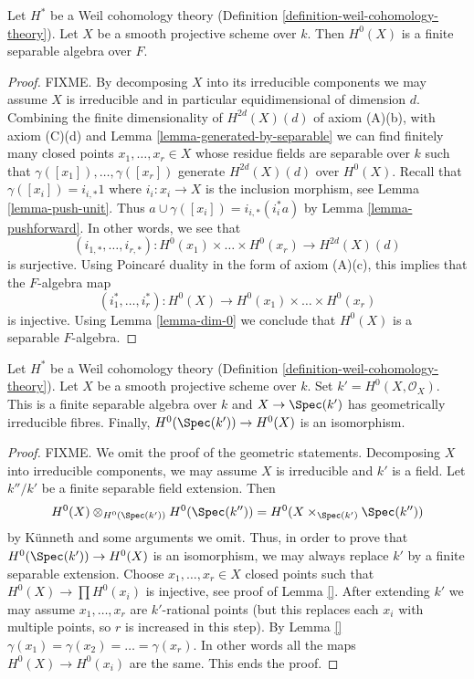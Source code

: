 \begin{lemma}
\label{lemma-H-0-separable}
Let $H^*$ be a Weil cohomology theory
(Definition \ref{definition-weil-cohomology-theory}).
Let $X$ be a smooth projective scheme over $k$. Then
$H^0(X)$ is a finite separable algebra over $F$.
\end{lemma}

\begin{proof}
FIXME. By decomposing $X$ into its irreducible components we may
assume $X$ is irreducible and in particular equidimensional
of dimension $d$. Combining the finite dimensionality of
$H^{2d}(X)(d)$ of axiom (A)(b), with axiom (C)(d) and
Lemma \ref{lemma-generated-by-separable}
we can find finitely many closed points
$x_1, \ldots, x_r \in X$ whose residue fields are
separable over $k$ such that $\gamma([x_1]), \ldots, \gamma([x_r])$
generate $H^{2d}(X)(d)$ over $H^0(X)$.
Recall that $\gamma([x_i]) = i_{i, *}1$ where
$i_i : x_i \to X$ is the inclusion morphism, see
Lemma \ref{lemma-push-unit}. Thus $a \cup \gamma([x_i]) = i_{i, *}(i_i^*a)$ by
Lemma \ref{lemma-pushforward}. In other words, we see that
$$
(i_{1, *}, \ldots, i_{r, *}) :
H^0(x_1) \times \ldots \times H^0(x_r)
\longrightarrow
H^{2d}(X)(d)
$$
is surjective. Using Poincar\'e duality in the form of axiom (A)(c),
this implies that the $F$-algebra map
$$
(i_1^*, \ldots, i_r^*) :
H^0(X)
\longrightarrow
H^0(x_1) \times \ldots \times H^0(x_r)
$$
is injective. Using Lemma \ref{lemma-dim-0} we conclude that
$H^0(X)$ is a separable $F$-algebra.
\end{proof}

\begin{lemma}
\label{lemma-H-0}
Let $H^*$ be a Weil cohomology theory
(Definition \ref{definition-weil-cohomology-theory}).
Let $X$ be a smooth projective scheme over $k$. Set
$k' = H^0(X, \mathcal{O}_X)$. This is a finite separable algebra
over $k$ and $X \to \Spec(k')$ has geometrically irreducible
fibres. Finally, $H^0(\Spec(k')) \to H^0(X)$ is an isomorphism.
\end{lemma}

\begin{proof}
FIXME.
We omit the proof of the geometric statements. Decomposing
$X$ into irreducible components, we may assume $X$ is irreducible
and $k'$ is a field. Let $k''/k'$ be a finite separable field
extension. Then
$$
H^0(X) \otimes_{H^0(\Spec(k'))} H^0(\Spec(k'')) =
H^0(X \times_{\Spec(k')} \Spec(k''))
$$
by K\"unneth and some arguments we omit. Thus, in order to prove that
$H^0(\Spec(k')) \to H^0(X)$ is an isomorphism, we may always replace
$k'$ by a finite separable extension. Choose $x_1, \ldots, x_r \in X$ closed
points such that $H^0(X) \to \prod H^0(x_i)$ is injective, see
proof of Lemma \ref{}.
After extending $k'$ we may assume $x_1, \ldots, x_r$
are $k'$-rational points (but this replaces each $x_i$ with multiple
points, so $r$ is increased in this step). By Lemma \ref{}
$\gamma(x_1) = \gamma(x_2) = \ldots = \gamma(x_r)$.
In other words all the maps $H^0(X) \to H^0(x_i)$
are the same. This ends the proof.
\end{proof}


